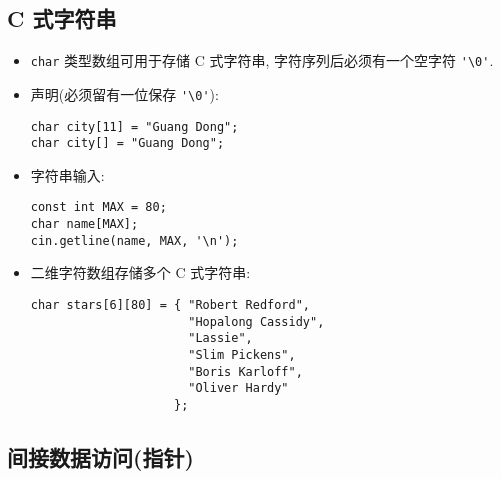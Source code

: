 \documentclass[a4paper,UTF8]{ctexart}
\begin{document}
\subsection{C 式字符串}

\begin{itemize}[leftmargin=0pt, rightmargin=0cm, labelwidth=0.8cm, labelsep=0.2cm]
\item \lstinline{char} 类型数组可用于存储 C 式字符串, 字符序列后必须有一个空字符
  \lstinline{'\0'}.
\item 声明(必须留有一位保存 \lstinline{'\0'}):
\begin{lstlisting}
char city[11] = "Guang Dong";
char city[] = "Guang Dong";
\end{lstlisting}
\item 字符串输入:
\begin{lstlisting}
const int MAX = 80;
char name[MAX];
cin.getline(name, MAX, '\n');
\end{lstlisting}
\item 二维字符数组存储多个 C 式字符串:
\begin{lstlisting}
char stars[6][80] = { "Robert Redford",
                      "Hopalong Cassidy",
                      "Lassie",
                      "Slim Pickens",
                      "Boris Karloff",
                      "Oliver Hardy"
                    };
\end{lstlisting}
\end{itemize}

\subsection{间接数据访问(指针)}
\end{document}
